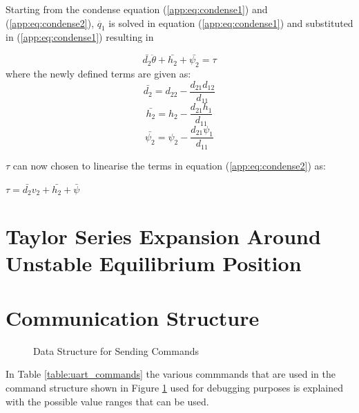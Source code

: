 Starting from the condense equation (\ref{app:eq:condense1}) and (\ref{app:eq:condense2}), $\ddot{q_{1}}$ is solved in equation (\ref{app:eq:condense1}) and substituted in (\ref{app:eq:condense1}) resulting in 

\begin{equation} \label{app:eq:condense2}
\bar{d_{2}}\ddot{\theta} + \bar{h_{2}} + \bar{\psi_{2}} = \tau
\end{equation}
where the newly defined terms are given as: 
$$\bar{d_{2}} = d_{22} - \frac{d_{21}d_{12}}{d_{11}}$$
$$\bar{h_{2}} = h_{2} - \frac{d_{21}h_{1}}{d_{11}} $$
$$\bar{\psi_{2}} = \psi_{2} - \frac{d_{21}\psi_{1}}{d_{11}} $$


$\tau$ can now chosen to linearise the terms in equation (\ref{app:eq:condense2}) as:

$\tau = \bar{d_{2}}v_{2}+\bar{h_{2}} + \bar{\psi}$


\section{Taylor Series Expansion Around Unstable Equilibrium Position}
\label{sec:linerisation}







\section{Communication Structure}
\label{sec:software_requirements}
\begin{figure}[h]
	\centering
	
	\caption{Data Structure for Sending Commands}
	\label{fig:uart_struct_app}
\end{figure}

In Table \ref{table:uart_commands} the various commmands that are used in the command structure shown in Figure \ref{fig:uart_struct_app} used for debugging purposes is explained with the possible value ranges that can be used.


